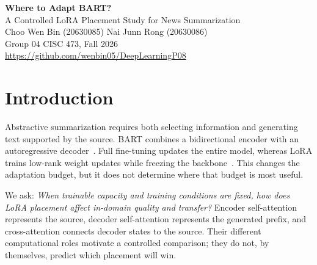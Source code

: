 \documentclass[11pt,letterpaper]{article}
\begin{document}
\begin{center}
{\LARGE\bfseries Where to Adapt BART?}\\[5pt]
{\large A Controlled LoRA Placement Study for News Summarization}\\[7pt]
Choo Wen Bin (20630085) \quad Nai Junn Rong (20630086)\\
Group 04 \quad CISC 473, Fall 2026\\
\url{https://github.com/wenbin05/DeepLearningP08}
\end{center}
\begin{abstract}
We study whether LoRA placement changes BART-base summarization under an equal trainable-parameter budget. Encoder self-attention, decoder self-attention, and cross-attention each receive 147,456 trainable parameters. We train on 1,024 CNN/DailyMail examples for 96 updates and evaluate three seeds on 128 held-out examples from each of CNN/DailyMail and XSum. Cross-attention attains the highest CNN/DailyMail ROUGE-1 among the matched placements, 38.56 $\pm$ 0.42, compared with 37.75 $\pm$ 0.29 for encoder and 37.50 $\pm$ 0.22 for decoder adaptation. Unadapted BART scores 38.61. Full fine-tuning, evaluated as a memory-adjusted reference, reaches 40.06 $\pm$ 0.62. Rank and projection ablations show that adding parameters does not monotonically improve ROUGE. A ten-participant study yields low agreement (Fleiss' $\kappa=0.044$), so its model-level ratings are descriptive. These results support a bounded placement comparison, but do not establish a factuality winner or performance on the full benchmarks.
\end{abstract}
\section{Introduction}
Abstractive summarization requires both selecting information and generating text supported by the source. BART combines a bidirectional encoder with an autoregressive decoder~\cite{bart}. Full fine-tuning updates the entire model, whereas LoRA trains low-rank weight updates while freezing the backbone~\cite{lora}. This changes the adaptation budget, but it does not determine where that budget is most useful.

We ask: \textit{When trainable capacity and training conditions are fixed, how does LoRA placement affect in-domain quality and transfer?} Encoder self-attention represents the source, decoder self-attention represents the generated prefix, and cross-attention connects decoder states to the source. Their different computational roles motivate a controlled comparison; they do not, by themselves, predict which placement will win.
\end{document}
